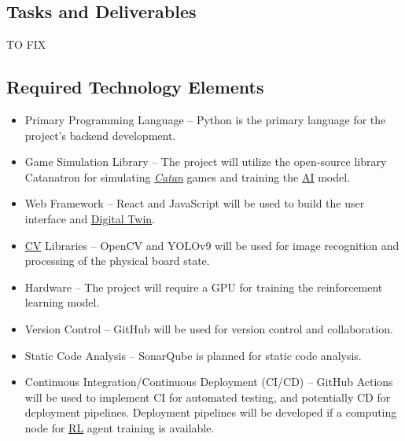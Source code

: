 \documentclass{article}
\newcommand{\Catan}{\href{https://en.wikipedia.org/wiki/Catan}{Catan}}
\newcommand{\AI}{\href{https://en.wikipedia.org/wiki/Artificial_intelligence}{AI}}
\newcommand{\RL}{\href{https://www.ibm.com/think/topics/reinforcement-learning}{RL}}
\newcommand{\DigitalTwin}{\href{https://en.wikipedia.org/wiki/Digital_twin}{Digital Twin}}
\newcommand{\CV}{\href{https://www.ibm.com/think/topics/computer-vision}{CV}}
\begin{document}
  \subsection{Tasks and Deliverables}\label{subsec:tasks}
  
TO FIX
    
    


\subsection{Required Technology Elements}\label{subsec:requiredtech}
\begin{itemize}
    \item {Primary Programming Language} – Python is the primary language for the project's backend development.
    \item {Game Simulation Library} – The project will utilize the open-source library Catanatron for simulating \emph{\Catan{}} games and training the \AI{} model.
    \item {Web Framework} – React and JavaScript will be used to build the user interface and \DigitalTwin{}.
    \item {\CV{} Libraries} – OpenCV and YOLOv9 will be used for image recognition and processing of the physical board state.
    \item {Hardware} – The project will require a GPU for training the reinforcement learning model.
    \item {Version Control} – GitHub will be used for version control and collaboration.
    \item {Static Code Analysis} – SonarQube is planned for static code analysis.
    \item {Continuous Integration/Continuous Deployment (CI/CD)} – GitHub Actions will be used to implement CI for automated testing, and potentially CD for deployment pipelines. Deployment pipelines will be developed if a computing node for \RL{} agent training is available.
\end{itemize}
\end{document}
